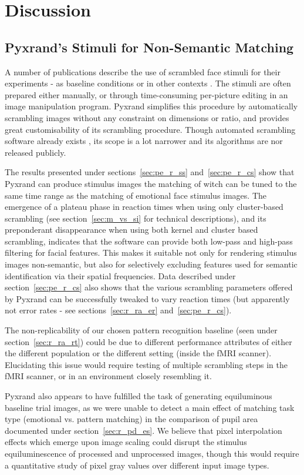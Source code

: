 \chapter{Discussion}
    \section{Pyxrand's Stimuli for Non-Semantic Matching}
	A number of publications describe the use of scrambled face stimuli for their experiments - as baseline conditions or in other contexts \citep{Lewis2005,Rakover2013}.
	The stimuli are often prepared either manually, or through time-consuming per-picture editing in an image manipulation program.
	Pyxrand \citep{pyxrand} simplifies this procedure by automatically scrambling images without any constraint on dimensions or ratio, and provides great customisability of its scrambling procedure. 
	Though automated scrambling software already exists \citep{Conway2008}, its scope is a lot narrower and its algorithms are nor released publicly.

	The results presented under sections~\ref{sec:pe_r_ss} and~\ref{sec:pe_r_cs} show that Pyxrand can produce stimulus images the matching of witch can be tuned to the same time range as the matching of emotional face stimulus images.
	The emergence of a plateau phase in reaction times when using only cluster-based scrambling (see section~\ref{sec:m_vs_si} for technical descriptions), and its preponderant disappearance when using both kernel and cluster based scrambling, indicates that the software can provide both low-pass and high-pass filtering for facial features.
	This makes it suitable not only for rendering stimulus images non-semantic, but also for selectively excluding features used for semantic identification via their spatial frequencies.
	Data described under section~\ref{sec:pe_r_cs} also shows that the various scrambling parameters offered by Pyxrand can be successfully tweaked to vary reaction times (but apparently not error rates - see sections~\ref{sec:r_ra_er} and~\ref{sec:pe_r_cs}).
	
	The non-replicability of our chosen pattern recognition baseline (seen under section~\ref{sec:r_ra_rt}) could be due to different performance attributes of either the different population or the different setting (inside the fMRI scanner).
	Elucidating this issue would require testing of multiple scrambling steps in the fMRI scanner, or in an environment closely resembling it. 
	
	Pyxrand also appears to have fulfilled the task of generating equiluminous baseline trial images, as we were unable to detect a main effect of matching task type (emotional vs. pattern matching) in the comparison of pupil area documented under section~\ref{sec:r_pd_es}.
	We believe that pixel interpolation effects which emerge upon image scaling could disrupt the stimulus equiluminescence of processed and unprocessed images, though this would require a quantitative study of pixel gray values over different input image types.
	
